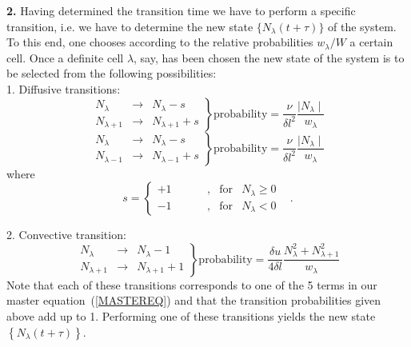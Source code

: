 {\bf{2.}} Having determined the transition time we have to perform a specific
transition, i.e. we have to determine the new state
$\{ N_{\lambda}(t+\tau ) \}$ of the system. To this end, one chooses
according to the relative probabilities
$w_{\lambda}/W$ a certain cell.
Once a definite cell $\lambda$, say, has been chosen the new state of the
system is to be selected from the following possibilities:  \\
1. Diffusive transitions:
\begin{displaymath}
\left. \begin{array}{lcl}
       N_{\lambda} & \rightarrow & N_{\lambda} - s \\
       N_{\lambda + 1} & \rightarrow & N_{\lambda + 1} + s
       \end{array} \right\}
\mbox{probability} = \frac{\nu}{\delta l^2}
            \frac{\mid N_{\lambda} \mid}{w_{\lambda}}
\end{displaymath}
\begin{displaymath}
\left. \begin{array}{lcl}
       N_{\lambda} & \rightarrow & N_{\lambda} - s \\
       N_{\lambda - 1} & \rightarrow & N_{\lambda - 1} + s
       \end{array} \right\}
\mbox{probability} = \frac{\nu}{\delta l^2}
    \frac{\mid N_{\lambda} \mid}{w_{\lambda}}
\end{displaymath}
where
\begin{displaymath}
s = \left\{ \begin{array}{rcll}
           +1 & \hspace{1cm}, & \mbox{for} & N_{\lambda} \ge 0 \\
           -1 & \hspace{1cm}, & \mbox{for} & N_{\lambda} < 0
           \end{array}
           \right. \;\;\; .
\end{displaymath}

2. Convective transition:
\begin{displaymath}
\left. \begin{array}{lcl}
       N_{\lambda} & \rightarrow & N_{\lambda} - 1 \\
       N_{\lambda + 1} & \rightarrow & N_{\lambda + 1} + 1 
       \end{array} \right\}
    \mbox{probability} = \frac{\delta u}{4\delta l}
    \frac{N_{\lambda}^2 + N_{\lambda+1}^2}{w_{\lambda}}
\end{displaymath}
Note that each of these transitions corresponds to one of the 5
terms in our master equation~(\ref{MASTEREQ}) and that the 
transition probabilities given above add up to 1.
Performing one of these transitions yields the new state
$\left\{ N_{\lambda}(t+\tau) \right\}$.

